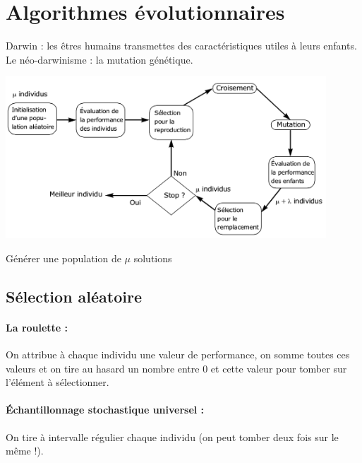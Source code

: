 \documentclass[11pt,a4paper]{report}
\begin{document}
\section{Algorithmes évolutionnaires}
Darwin : les êtres humains transmettes des caractéristiques utiles à leurs enfants. Le néo-darwinisme : la mutation génétique.

\begin{center}
    \includegraphics[width=0.9\textwidth]{img/schema.png}
\end{center}

\begin{algorithm}[H]
\caption{Générer une population de $\mu$ solutions}
\end{algorithm}

\subsection{Sélection aléatoire}

\paragraph*{La roulette : } On attribue à chaque individu une valeur de performance, on somme toutes ces valeurs et on tire au hasard un nombre entre $0$ et cette valeur pour tomber sur l'élément à sélectionner.

\paragraph*{Échantillonnage stochastique universel : } On tire à intervalle régulier chaque individu (on peut tomber deux fois sur le même !).
\end{document}
